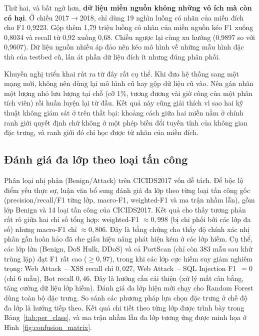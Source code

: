 Thứ hai, và bất ngờ hơn, \textbf{dữ liệu miền nguồn không những vô ích mà còn có hại}. Ở chiều 2017$\rightarrow$2018, chỉ dùng 19 nghìn luồng có nhãn của miền đích cho F1 0{,}9223. Gộp thêm 1{,}79 triệu luồng có nhãn của miền nguồn kéo F1 xuống 0{,}8034 và recall từ 0{,}92 xuống 0{,}68. Chiều ngược lại cùng xu hướng (0{,}9897 so với 0{,}9607). Dữ liệu nguồn nhiều áp đảo nên kéo mô hình về những mẫu hình đặc thù của testbed cũ, lấn át phần dữ liệu đích ít nhưng đúng phân phối.

Khuyến nghị triển khai rút ra từ đây rất cụ thể. Khi đưa hệ thống sang một mạng mới, không nên dùng lại mô hình cũ hay gộp dữ liệu cũ vào. Nên gán nhãn một lượng nhỏ lưu lượng tại chỗ (cỡ 1\%, tương đương vài giờ công của một phân tích viên) rồi huấn luyện lại từ đầu. Kết quả này cũng giải thích vì sao hai kỹ thuật không giám sát ở trên thất bại: khoảng cách giữa hai miền nằm ở chính ranh giới quyết định chứ không ở một phép biến đổi tuyến tính của không gian đặc trưng, và ranh giới đó chỉ học được từ nhãn của miền đích.

\subsection{Đánh giá đa lớp theo loại tấn công}
\label{sec:multiclass}
Phân loại nhị phân (Benign/Attack) trên CICIDS2017 vốn dễ tách. Để bộc lộ điểm yếu thực sự, luận văn bổ sung đánh giá đa lớp theo từng loại tấn công gốc (precision/recall/F1 từng lớp, macro-F1, weighted-F1 và ma trận nhầm lẫn), gồm lớp Benign và 14 loại tấn công của CICIDS2017. Kết quả cho thấy tương phản rất rõ giữa hai chỉ số tổng hợp: weighted-F1 $\approx 0{,}998$ (bị chi phối bởi các lớp đa số) nhưng macro-F1 chỉ $\approx 0{,}806$. Đây là bằng chứng cho thấy độ chính xác nhị phân gần hoàn hảo đã che giấu hiệu năng phát hiện kém ở các lớp hiếm. Cụ thể, các lớp lớn (Benign, DoS Hulk, DDoS) và cả PortScan (chỉ còn 383 mẫu sau khử trùng lặp) đạt F1 rất cao ($\geq 0{,}97$), trong khi các lớp cực hiếm suy giảm nghiêm trọng: Web Attack~-- XSS recall chỉ $0{,}027$, Web Attack~-- SQL Injection F1~$=0$ (chỉ 6 mẫu), Bot recall $0{,}46$. Đây là hướng cần cải thiện (xử lý mất cân bằng, tăng cường dữ liệu lớp hiếm). Đánh giá đa lớp hiện mới chạy cho Random Forest dùng toàn bộ đặc trưng. So sánh các phương pháp lựa chọn đặc trưng ở chế độ đa lớp là hướng tiếp theo. Kết quả chi tiết theo từng lớp được trình bày trong Bảng~\ref{tab:per_class}, và ma trận nhầm lẫn đa lớp tương ứng được minh họa ở Hình~\ref{fig:confusion_matrix}.

